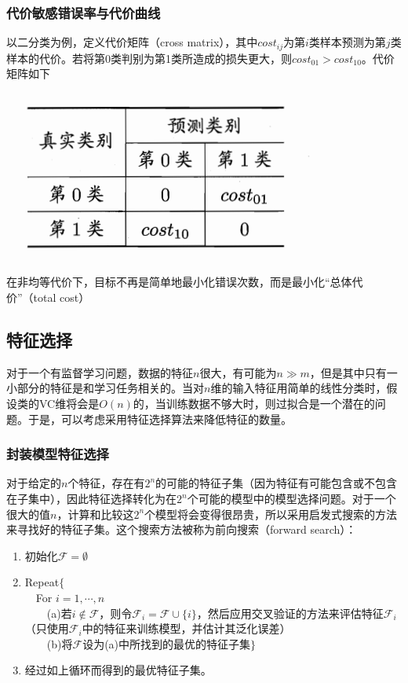 \subsubsection{代价敏感错误率与代价曲线}
以二分类为例，定义代价矩阵（cross matrix），其中$cost_{ij}$为第$i$类样本预测为第$j$类样本的代价。若将第0类判别为第1类所造成的损失更大，则$cost_{01}>cost_{10}$。代价矩阵如下
\begin{center}
\includegraphics[scale=0.7]{../figures/RAMS4.PNG} 
\end{center}

在非均等代价下，目标不再是简单地最小化错误次数，而是最小化“总体代价”（total cost）







\subsection{特征选择}
对于一个有监督学习问题，数据的特征$n$很大，有可能为$n\gg m$，但是其中只有一小部分的特征是和学习任务相关的。当对$n$维的输入特征用简单的线性分类时，假设类的VC维将会是$O(n)$的，当训练数据不够大时，则过拟合是一个潜在的问题。于是，可以考虑采用特征选择算法来降低特征的数量。

\subsubsection{封装模型特征选择}
对于给定的$n$个特征，存在有$2^n$的可能的特征子集（因为特征有可能包含或不包含在子集中），因此特征选择转化为在$2^n$个可能的模型中的模型选择问题。对于一个很大的值$n$，计算和比较这$2^n$个模型将会变得很昂贵，所以采用启发式搜索的方法来寻找好的特征子集。这个搜索方法被称为前向搜索（forward search）：
\begin{enumerate}[1]
\item 初始化$\mathcal{F}=\emptyset$
\item Repeat$\{$\\
\indent \ \ For $i=1,\cdots,n$\\
\indent \ \ \ \ (a)若$i\notin \mathcal{F}$，则令$\mathcal{F}_i=\mathcal{F}\cup\{i\}$，然后应用交叉验证的方法来评估特征$\mathcal{F}_i$（只使用$\mathcal{F}_i$中的特征来训练模型，并估计其泛化误差）
\\
\indent \ \ \ \ (b)将$\mathcal{F}$设为(a)中所找到的最优的特征子集$\}$
\item 经过如上循环而得到的最优特征子集。
\end{enumerate}

